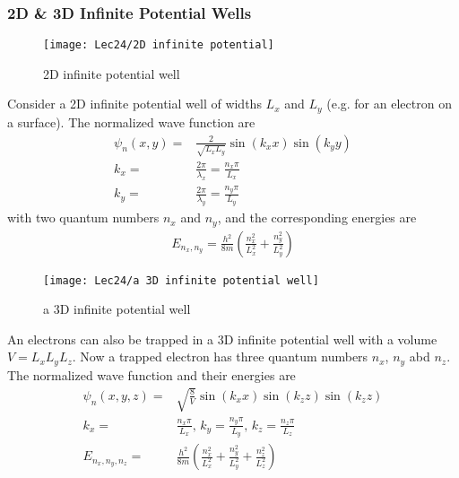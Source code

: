 \subsubsection{2D \& 3D Infinite Potential Wells}

\begin{figure}[H]
    \centering
    \texttt{[image: Lec24/2D infinite potential]}
    \caption{2D infinite potential well}
\end{figure}

Consider a 2D infinite potential well of widths $L_x$ and $L_y$ (e.g. for an electron on a surface). The normalized wave function are
\begin{align*}
    \psi_n(x,y)=&\frac{2}{\sqrt{L_x L_y}}\sin (k_x x)\sin(k_y y)\\
    k_x=&\frac{2\pi}{\lambda_x}=\frac{n_x \pi}{L_x}\\
    k_y=&\frac{2\pi}{\lambda_y}=\frac{n_y \pi}{L_y}
\end{align*}
with two quantum numbers $n_x$ and $n_y$, and the corresponding energies are
\begin{align*}
    E_{n_x,n_y}=\frac{h^2}{8m}\left(\frac{n_x^2}{L_x^2}+\frac{n_y^2}{L_y^2}\right)
\end{align*}

\begin{figure}[H]
    \centering
    \texttt{[image: Lec24/a 3D infinite potential well]}
    \caption{a 3D infinite potential well}
\end{figure}

An electrons can also be trapped in a 3D infinite potential well with a volume $V=L_x L_y L_z$. Now a trapped electron has three quantum numbers $n_x$, $n_y$ abd $n_z$. The normalized wave function and their energies are
\begin{align*}
    \psi_n(x,y,z)=&\sqrt{\frac{8}{V}}\sin (k_x x) \sin (k_z z) \sin (k_z z)\\
    k_x=&\frac{n_x \pi}{L_x},\,k_y=\frac{n_y \pi}{L_y},\,k_z=\frac{n_z \pi}{L_z} \\
    E_{n_x,n_y,n_z}=&\frac{h^2}{8m}\left(\frac{n_x^2}{L_x^2}+\frac{n_y^2}{L_y^2}+\frac{n_z^2}{L_z^2}\right)
\end{align*}